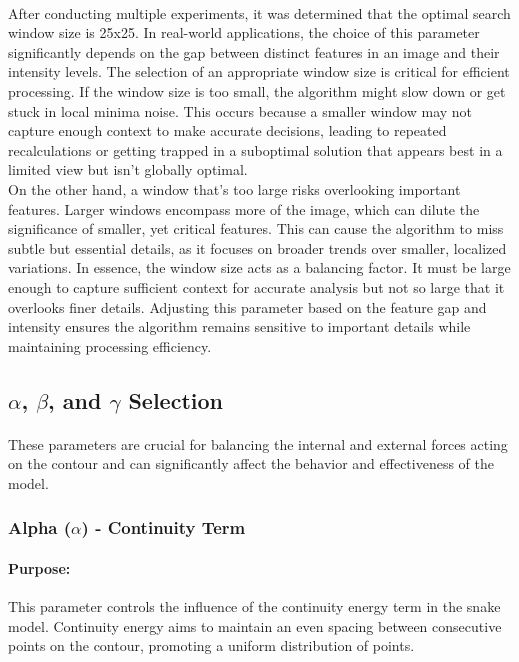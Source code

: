 \documentclass[12pt,a4paper]{report}
\begin{document}
\paragraph*{}
After conducting multiple experiments, it was determined that the optimal search window size is 25x25. In real-world applications, the choice of this parameter significantly depends on the gap between distinct features in an image and their intensity levels. The selection of an appropriate window size is critical for efficient processing. If the window size is too small, the algorithm might slow down or get stuck in local minima noise. This occurs because a smaller window may not capture enough context to make accurate decisions, leading to repeated recalculations or getting trapped in a suboptimal solution that appears best in a limited view but isn't globally optimal.\\
On the other hand, a window that's too large risks overlooking important features. Larger windows encompass more of the image, which can dilute the significance of smaller, yet critical features. This can cause the algorithm to miss subtle but essential details, as it focuses on broader trends over smaller, localized variations. In essence, the window size acts as a balancing factor. It must be large enough to capture sufficient context for accurate analysis but not so large that it overlooks finer details. Adjusting this parameter based on the feature gap and intensity ensures the algorithm remains sensitive to important details while maintaining processing efficiency.

\subsection{\(\alpha\), \(\beta\), and \(\gamma\) Selection}
\paragraph*{}
These parameters are crucial for balancing the internal and external forces acting on the contour and can significantly affect the behavior and effectiveness of the model.

\subsubsection*{Alpha (\(\alpha\)) - Continuity Term}
\paragraph*{Purpose:} 
This parameter controls the influence of the continuity energy term in the snake model. Continuity energy aims to maintain an even spacing between consecutive points on the contour, promoting a uniform distribution of points.
\end{document}

